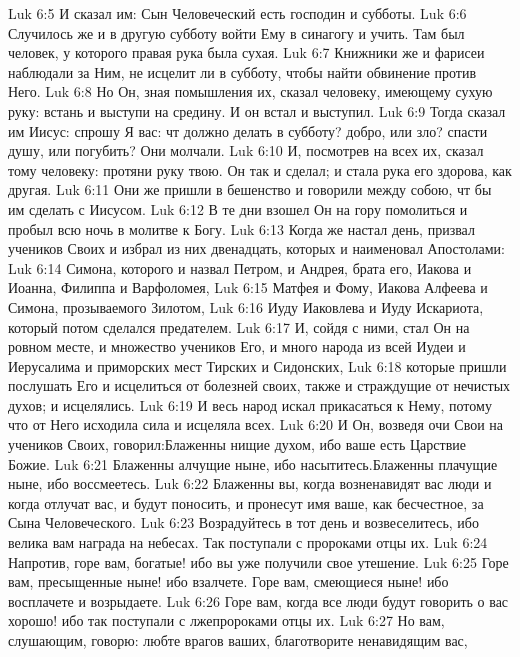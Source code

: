 \vs Luk 6:5 И сказал им: Сын Человеческий есть господин и субботы.
\rsbpar\vs Luk 6:6 Случилось же и в другую субботу войти Ему в синагогу и учить. Там был человек, у которого правая рука была сухая.
\vs Luk 6:7 Книжники же и фарисеи наблюдали за Ним, не исцелит ли в субботу, чтобы найти обвинение против Него.
\vs Luk 6:8 Но Он, зная помышления их, сказал человеку, имеющему сухую руку: встань и выступи на средину. И он встал и выступил.
\vs Luk 6:9 Тогда сказал им Иисус: спрошу Я вас: чт должно делать в субботу? добро, или зло? спасти душу, или погубить? Они молчали.
\vs Luk 6:10 И, посмотрев на всех их, сказал тому человеку: протяни руку твою. Он так и сделал; и стала рука его здорова, как другая.
\vs Luk 6:11 Они же пришли в бешенство и говорили между собою, чт бы им сделать с Иисусом.
\rsbpar\vs Luk 6:12 В те дни взошел Он на гору помолиться и пробыл всю ночь в молитве к Богу.
\vs Luk 6:13 Когда же настал день, призвал учеников Своих и избрал из них двенадцать, которых и наименовал Апостолами:
\vs Luk 6:14 Симона, которого и назвал Петром, и Андрея, брата его, Иакова и Иоанна, Филиппа и Варфоломея,
\vs Luk 6:15 Матфея и Фому, Иакова Алфеева и Симона, прозываемого Зилотом,
\vs Luk 6:16 Иуду Иаковлева и Иуду Искариота, который потом сделался предателем.
\rsbpar\vs Luk 6:17 И, сойдя с ними, стал Он на ровном месте, и множество учеников Его, и много народа из всей Иудеи и Иерусалима и приморских мест Тирских и Сидонских,
\vs Luk 6:18 которые пришли послушать Его и исцелиться от болезней своих, также и страждущие от нечистых духов; и исцелялись.
\vs Luk 6:19 И весь народ искал прикасаться к Нему, потому что от Него исходила сила и исцеляла всех.
\vs Luk 6:20 И Он, возведя очи Свои на учеников Своих, говорил:\rsbpar Блаженны нищие духом, ибо ваше есть Царствие Божие.
\rsbpar\vs Luk 6:21 Блаженны алчущие ныне, ибо насытитесь.\rsbpar Блаженны плачущие ныне, ибо воссмеетесь.
\rsbpar\vs Luk 6:22 Блаженны вы, когда возненавидят вас люди и когда отлучат вас, и будут поносить, и пронесут имя ваше, как бесчестное, за Сына Человеческого.
\vs Luk 6:23 Возрадуйтесь в тот день и возвеселитесь, ибо велика вам награда на небесах. Так поступали с пророками отцы их.
\rsbpar\vs Luk 6:24 Напротив, горе вам, богатые! ибо вы уже получили свое утешение.
\vs Luk 6:25 Горе вам, пресыщенные ныне! ибо взалчете. Горе вам, смеющиеся ныне! ибо восплачете и возрыдаете.
\vs Luk 6:26 Горе вам, когда все люди будут говорить о вас хорошо! ибо так поступали с лжепророками отцы их.
\rsbpar\vs Luk 6:27 Но вам, слушающим, говорю: любте врагов ваших, благотворите ненавидящим вас,
